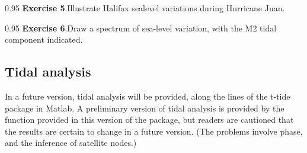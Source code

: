 \documentclass{article}
\newcommand{\workedexercise}[2]{
	\vspace{2ex plus 2ex minus 1ex}
	\begin{boxedminipage}[c]{0.95\linewidth}
		{\textbf{Exercise #1}.\hspace{1em}#2}
	\end{boxedminipage}
	\vspace{2ex plus 2ex minus 1ex}
}
\begin{document}
\workedexercise{5}{Illustrate Halifax sealevel variations during Hurricane Juan.}

\workedexercise{6}{Draw a spectrum of sea-level variation, with the M2 tidal component indicated.}

\subsection{Tidal analysis}

In a future version, tidal analysis will be provided, along the lines of the
t-tide package in Matlab.  A preliminary version of tidal analysis is provided
by the \verb@tidem@ function provided in this version of the package, but
readers are cautioned that the results are certain to change in a future
version.  (The problems involve phase, and the inference of satellite nodes.)

\end{document}

